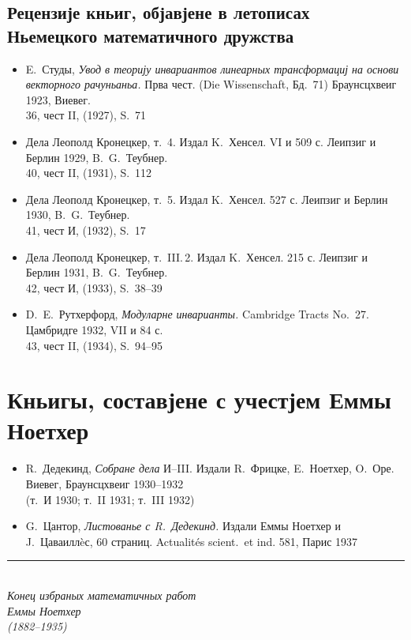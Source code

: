 \documentclass[11pt]{article}
\newcommand{\foreign}[1]{#1}
\begin{document}
\subsection*{Рецензије кньиг, објавјене в летописах Ньемецкого математичного дружства}

\begin{itemize}[leftmargin=1.5em,itemsep=0.2em]
\item E.\ Студы, \textit{Увод в теорију инвариантов линеарных трансформациј на основи векторного рачуньаньа.} Прва чест. (\foreign{Die Wissenschaft}, Бд.~71) Браунсцхвеиг 1923, Виевег.\\
36, чест II, (1927), S.~71

\item Дела Леополд Кронецкер, т.~4. Издал K.\ Хенсел. VI и 509 с. Леипзиг и Берлин 1929, B.\ G.\ Теубнер.\\
40, чест II, (1931), S.~112

\item Дела Леополд Кронецкер, т.~5. Издал K.\ Хенсел. 527 с. Леипзиг и Берлин 1930, B.\ G.\ Теубнер.\\
41, чест И, (1932), S.~17

\item Дела Леополд Кронецкер, т.~III.\,2. Издал K.\ Хенсел. 215 с. Леипзиг и Берлин 1931, B.\ G.\ Теубнер.\\
42, чест И, (1933), S.~38--39

\item D.\ E.\ Рутхерфорд, \textit{Модуларне инварианты.} \foreign{Cambridge Tracts No.~27.} Цамбридге 1932, VII и 84 с.\\
43, чест II, (1934), S.~94--95
\end{itemize}

\newpage
\section*{Кньигы, составјене с учестјем Еммы Ноетхер}

\begin{itemize}[leftmargin=1.5em,itemsep=0.5em]
\item R.\ Дедекинд, \textit{Собране дела} И--III. Издали R.\ Фрицке, E.\ Ноетхер, O.\ Оре. Виевег, Браунсцхвеиг 1930--1932\\
(т.~И 1930; т.~II 1931; т.~III 1932)

\item G.\ Цантор, \textit{Листованье с R.\ Дедекинд.} Издали Еммы Ноетхер и J.\ Цаваиллèс, 60 страниц. \foreign{Actualités scient.\ et ind.} 581, Парис 1937
\end{itemize}

\vfill

\begin{center}
\rule{0.5\textwidth}{0.4pt}\\[1em]
\textit{Конец избраных математичных работ}\\[0.5em]
\textit{Еммы Ноетхер}\\[0.5em]
\textit{(1882--1935)}
\end{center}
\end{document}
